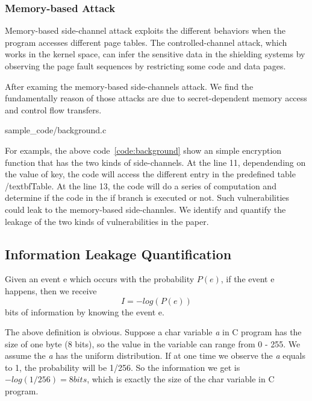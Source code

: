 \subsubsection{Memory-based Attack}
Memory-based side-channel attack\cite{} exploits the different behaviors when the
program accesses different page tables. The controlled-channel attack\cite{7163052},
which works in the kernel space, can infer the sensitive data in the shielding systems by
observing the page fault sequences by restricting some code and
data pages. 

After examing the memory-based side-channels attack. We find the fundamentally
reason of those attacks are due to secret-dependent memory access and control
flow transfers.

                 {sample_code/background.c}

For exampls, the above code~\ref{code:background} show an simple encryption function that
has the two kinds of side-channels. At the line 11, dependending on the value of key,
the code will access the different entry in the predefined table /textbf{Table}. At the
line 13, the code will do a series of computation and determine if the code in the if
branch is executed or not. Such vulnerabilities could leak to the memory-based 
side-channles. We identify and quantify the leakage of the two kinds of vulnerabilities 
in the paper.

\subsection{Information Leakage Quantification}
Given an event e which occurs with the probability $P(e)$, if the event e happens, 
then we receive
\begin{equation}
    I = - log(P(e))
\end{equation}
bits of information by knowing the event e.

The above definition is obvious. Suppose a char variable \textit{a} in C program has the size
of one byte (8 bits), so the value in the variable can range from 0 - 255. We assume
the \textit{a} has the uniform distribution. If at one time we observe the \textit{a}
equals to 1, the probability will be 1/256. So the information we get is 
$-log(1/256) = 8 bits$, which is exactly the size of the char variable in C program.

